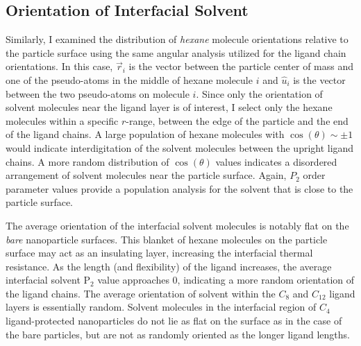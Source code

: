 \subsection{Orientation of Interfacial Solvent}

Similarly, I examined the distribution of \emph{hexane} molecule
orientations relative to the particle surface using the same angular
analysis utilized for the ligand chain orientations. In this case,
$\vec{r}_i$ is the vector between the particle center of mass and one
of the  pseudo-atoms in the middle of hexane molecule $i$ and
$\hat{u}_i$ is the vector between the two  pseudo-atoms on
molecule $i$. Since only the orientation of
solvent molecules near the ligand layer is of interest, 
I select only the hexane
molecules within a specific $r$-range, between the edge of the
particle and the end of the ligand chains. A large population of
hexane molecules with $\cos{(\theta)} \sim \pm 1$ would indicate
interdigitation of the solvent molecules between the upright ligand
chains. A more random distribution of $\cos{(\theta)}$ values
indicates a disordered arrangement of solvent molecules near the particle
surface. Again, $P_2$ order parameter values provide a population
analysis for the solvent that is close to the particle surface.

The average orientation of the interfacial solvent molecules is
notably flat on the \emph{bare} nanoparticle surfaces. This blanket of
hexane molecules on the particle surface may act as an insulating
layer, increasing the interfacial thermal resistance. As the length
(and flexibility) of the ligand increases, the average interfacial
solvent P$_2$ value approaches 0, indicating a more random orientation
of the ligand chains. The average orientation of solvent within the
$C_8$ and $C_{12}$ ligand layers is essentially random. Solvent
molecules in the interfacial region of $C_4$ ligand-protected
nanoparticles do not lie as flat on the surface as in the case of the
bare particles, but are not as randomly oriented as the longer ligand
lengths.

